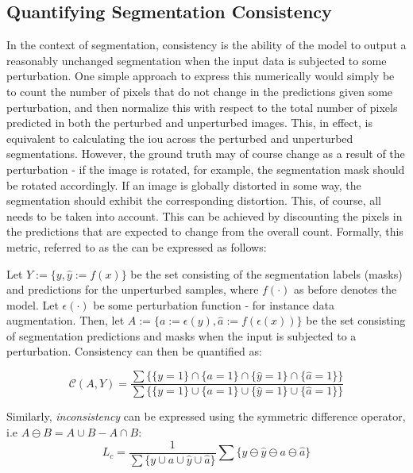 \subsection{Quantifying Segmentation Consistency}
In the context of segmentation, consistency is the ability of the model to output a reasonably unchanged segmentation when the input data is subjected to some perturbation. One simple approach to express this numerically would simply be to count the number of pixels that do not change in the predictions given some perturbation, and then normalize this with respect to the total number of pixels predicted in both the perturbed and unperturbed images. This, in effect, is equivalent to calculating the \gls{iou} across the perturbed and unperturbed segmentations. However, the ground truth may of course change as a result of the perturbation - if the image is rotated, for example, the segmentation mask should be rotated accordingly. If an image is globally distorted in some way, the segmentation should exhibit the corresponding distortion. This, of course, all needs to be taken into account. This can be achieved by discounting the pixels in the predictions that are expected to change from the overall count. Formally, this metric, referred to as the  can be expressed as follows:

Let \(Y:=\{y,\hat{y}:=f(x)\}\) be the set consisting of the segmentation labels (masks) and predictions for the unperturbed samples, where \(f(\cdot)\) as before denotes the model. Let \(\epsilon(\cdot)\) be some perturbation function - for instance data augmentation. Then, let \(A:=\{a:=\epsilon(y),\hat{a}:=f(\epsilon(x))\}\) be the set consisting of segmentation predictions and masks when the input is subjected to a perturbation. Consistency can then be quantified as:

\begin{equation}
    \mathcal{C}(A,Y) = \frac{\sum\{\{y=1\} \cap \{a=1\} \cap \{\hat{y}=1\} \cap \{\hat{a}=1\} \}}
    {\sum\{\{y=1\} \cup \{a=1\} \cup \{\hat{y}=1\} \cup \{\hat{a}=1\} \}}
\end{equation}

Similarly, \textit{inconsistency} can be expressed using the symmetric difference operator, i.e \(A \ominus B = A \cup B - A \cap B\): 
\begin{equation}\label{sil}
    L_c = \frac{1}{\sum\{y \cup a \cup \hat{y} \cup \hat{a} \}} \sum \{y\ominus\hat{y}\ominus a\ominus\hat{a}\}
\end{equation}

